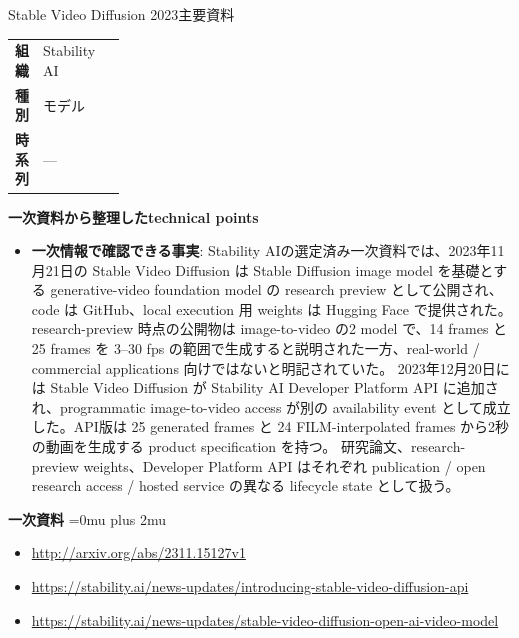 \begin{technicalnote}{Stable Video Diffusion 2023}{主要資料}
\begingroup
\begin{tabularx}{\linewidth}{@{}>{\bfseries}p{0.22\linewidth}X@{}}
組織 & Stability AI \\
種別 & モデル \\
時系列 & — \\
\end{tabularx}
\smallskip
{\bfseries 一次資料から整理したtechnical points}
\begin{itemize}[leftmargin=1.5em,itemsep=0.35em]
\item \textbf{一次情報で確認できる事実}: Stability AIの選定済み一次資料では、2023年11月21日の Stable Video Diffusion は Stable Diffusion image model を基礎とする generative-video foundation model の research preview として公開され、code は GitHub、local execution 用 weights は Hugging Face で提供された。 research-preview 時点の公開物は image-to-video の2 model で、14 frames と 25 frames を 3--30 fps の範囲で生成すると説明された一方、real-world / commercial applications 向けではないと明記されていた。 2023年12月20日には Stable Video Diffusion が Stability AI Developer Platform API に追加され、programmatic image-to-video access が別の availability event として成立した。API版は 25 generated frames と 24 FILM-interpolated frames から2秒の動画を生成する product specification を持つ。 研究論文、research-preview weights、Developer Platform API はそれぞれ publication / open research access / hosted service の異なる lifecycle state として扱う。
\end{itemize}
\begin{minipage}{\linewidth}
\begin{samepage}
{\bfseries 一次資料}
\begingroup\sloppy
\Urlmuskip=0mu plus 2mu\relax
\begin{itemize}[leftmargin=1.5em,itemsep=0.25em]
\item {\scriptsize\url{http://arxiv.org/abs/2311.15127v1}}
\item {\scriptsize\url{https://stability.ai/news-updates/introducing-stable-video-diffusion-api}}
\item {\scriptsize\url{https://stability.ai/news-updates/stable-video-diffusion-open-ai-video-model}}
\end{itemize}
\endgroup
\end{samepage}
\end{minipage}
\endgroup
\end{technicalnote}
\medskip

